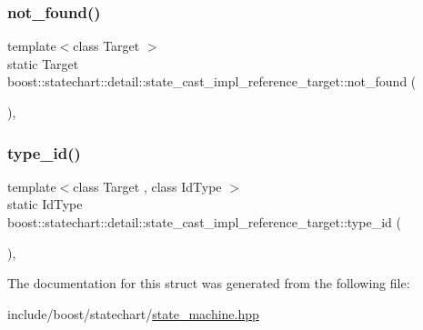 \subsubsection{\texorpdfstring{not\+\_\+found()}{not\_found()}}
{\footnotesize\ttfamily template$<$class Target $>$ \\
static Target boost\+::statechart\+::detail\+::state\+\_\+cast\+\_\+impl\+\_\+reference\+\_\+target\+::not\+\_\+found (\begin{DoxyParamCaption}{ }\end{DoxyParamCaption})\hspace{0.3cm}{\ttfamily [inline]}, {\ttfamily [static]}}

\mbox{\label{structboost_1_1statechart_1_1detail_1_1state__cast__impl__reference__target_a65f19c3a6aefde938823c560f52f7a10}} 
\subsubsection{\texorpdfstring{type\+\_\+id()}{type\_id()}}
{\footnotesize\ttfamily template$<$class Target , class Id\+Type $>$ \\
static Id\+Type boost\+::statechart\+::detail\+::state\+\_\+cast\+\_\+impl\+\_\+reference\+\_\+target\+::type\+\_\+id (\begin{DoxyParamCaption}{ }\end{DoxyParamCaption})\hspace{0.3cm}{\ttfamily [inline]}, {\ttfamily [static]}}



The documentation for this struct was generated from the following file\+:\begin{DoxyCompactItemize}
\item 
include/boost/statechart/\mbox{\hyperlink{state__machine_8hpp}{state\+\_\+machine.\+hpp}}\end{DoxyCompactItemize}
